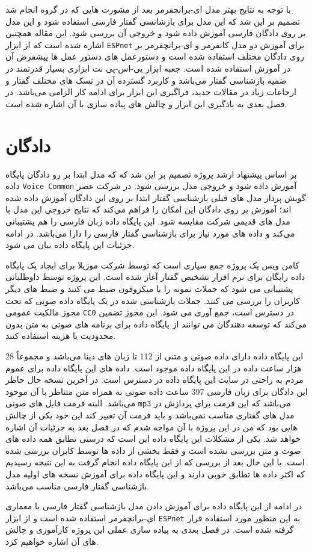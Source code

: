 با توجه به نتایج بهتر مدل ای-برانچفرمر بعد از مشورت هایی که در گروه انجام شد تصمیم بر این شد که این مدل برای بازشانسی گفتار فارسی استفاده شود و این مدل بر روی دادگان فارسی آموزش داده شود و خروجی آن بررسی شود.
این مقاله همچنین اشاره شده است که از ابزار
\verb|ESPnet|
برای آموزش دو مدل کانفرمر و ای-برانچفرمر بر روی دادگان مختلف استفاده شده است و دستورعمل های
 دستور عمل ها
پیشفرض آن در آموزش استفاده شده است.
جعبه ابزار یی-اس-پی نت ابزاری بسیار قدرتمند در ضمیه بازشناسی گفتار می‌باشد
و کاربرد گسترده آن در تسک های مختلف گفتار و ارجاعات زیاد در مقالات جدید، فراگیری این ابزار برای ادامه کار الزامی می‌باشد. در فصل بعدی به یادگیری این ابزار و چالش های پیاده سازی با آن اشاره شده است.


\section{دادگان}\label{sec5}
بر اساس پیشنهاد ارشد پروژه تصمیم بر این شد که که مدل ابتدا بر رو دادگان پایگاه داده 
\verb|Voice Common|
آموزش داده شود و خروجی مدل بررسی شود.
در شرکت عصر گویش پرداز مدل های قبلی 
بازشناسی گفتار
ابتدا بر روی این دادگان آموزش داده شده اند؛ آموزش بر روی دادگان این امکان را فراهم می‌کند که نتایج خروجی این مدل با مدل های قدیمی شرکت مقایسه شود. این پایگاه داده زبان فارسی را هم پشتیبانی می‌کند و داده های مورد نیاز برای بازشناسی گفتار فارسی را دارا می‌باشد. در ادامه جزئیات این پایگاه داده بیان می شود.

کامن ویس
یک پروژه جمع سپاری است که توسط شرکت موزیلا برای ایجاد یک پایگاه داده رایگان برای نرم افزار تشخیص گفتار آغاز شده است. این پروژه توسط داوطلبانی پشتیبانی می شود که جملات نمونه را با میکروفون ضبط می کنند و ضبط های دیگر کاربران را بررسی می کنند. جملات بازشناسی شده در یک پایگاه داده صوتی که تحت مجوز مالکیت عمومی
\verb|CC0|
در دسترس است، جمع آوری می شود. این مجوز تضمین می‌کند که توسعه دهندگان می توانند از پایگاه داده برای برنامه های صوتی به متن بدون محدودیت یا هزینه استفاده کنند.

این پایگاه داده دارای داده صوتی و متنی از 112 تا زبان های دینا می‌باشد و مجموعاً 28 هزار ساعت داده در این پایگاه داده موجود است. داده های این پایگاه داده برای عموم مردم به راحتی در سایت این پایگاه داده در دسترس است.
در آخرین نسخه حال حاظر این دادگان برای زبان فارسی 397 ساعت داده صوتی به همراه متن متناظر با آن موجود می‌باشد. البته فرمت فایل های صوتی 
\verb|mp3|
می‌باشد که این فرمت برای پردازش در مدل های گفتاری مناسب نمی‌باشد و باید فرمت آن تغییر کند این خود یکی از چالش هایی بود که من در این پروژه با آن مواجه شدم که در فصل بعد به جزئیات آن اشاره خواهد شد. یکی از مشکلات این پایگاه داده این است که درستی تطابق همه داده های صوت و متن بررسی نشده است و فقط بخشی از داده ها توسط کابران بررسی شده است. با این حال بعد از بررسی که از این پایگاه داده انجام گرفت به این نتیجه رسیدیم که اکثر داده ها تطابق خوبی دارند و این پایگاه داده برای آموزش نسخه های اولیه مدل بازشناسی گفتار فارسی مناسب می‌باشد.

در ادامه از این پایگاه داده برای آموزش دادن مدل بازشناسی گفتار فارسی با معماری ای-برانچفرمر استفاده شده است و از ابزار
\verb|ESPnet|
به این منظور مورد استفاده قرار گرفته شده است. در فصل بعدی به پیاده سازی عملی این پروژه کارآموزی و چالش های آن اشاره خواهیم کرد.

